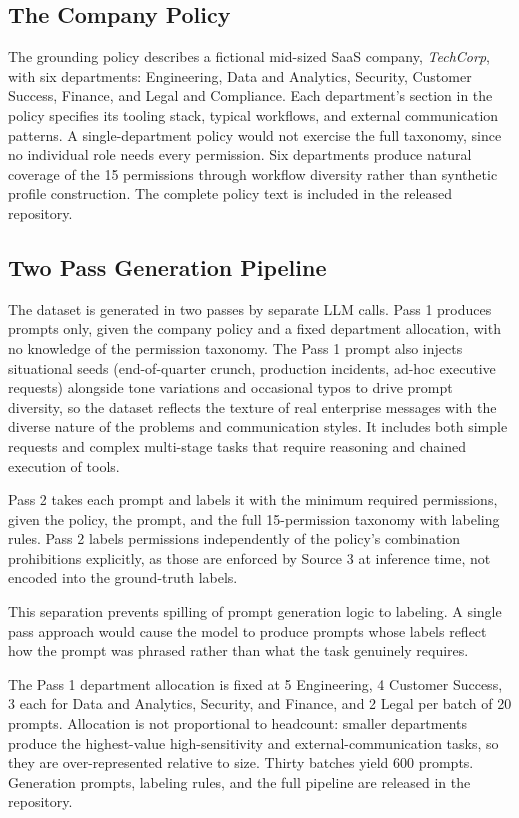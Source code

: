 \documentclass{article}
\theoremstyle{plain}
\theoremstyle{definition}
\theoremstyle{remark}
\begin{document}
\subsection{The Company Policy}
The grounding policy describes a fictional mid-sized SaaS company, 
\emph{TechCorp}, with six departments: Engineering, Data and Analytics, 
Security, Customer Success, Finance, and Legal and Compliance. Each 
department's section in the policy specifies its tooling stack, typical 
workflows, and external communication patterns. A single-department policy would not 
exercise the full taxonomy, since no individual role needs every 
permission. Six departments produce natural coverage of the 15 
permissions through workflow diversity rather than synthetic profile 
construction. The complete policy text is included in the released 
repository.

\subsection{Two Pass Generation Pipeline}
The dataset is generated in two passes by separate LLM calls. Pass 1 
produces prompts only, given the company policy and a fixed department 
allocation, with no knowledge of the permission taxonomy. The Pass 1 
prompt also injects situational seeds (end-of-quarter crunch, production 
incidents, ad-hoc executive requests) alongside tone variations and 
occasional typos to drive prompt diversity, so the dataset reflects the 
texture of real enterprise messages with the diverse nature of the problems and 
communication styles. It includes both simple requests and complex 
multi-stage tasks that require reasoning and chained execution of tools.

Pass 2 takes each prompt and labels it with the minimum required 
permissions, given the policy, the prompt, and the full 15-permission 
taxonomy with labeling rules. Pass 2 labels permissions independently 
of the policy's combination prohibitions explicitly, as those are 
enforced by Source 3 at inference time, not encoded into the 
ground-truth labels.

This separation prevents spilling of prompt generation 
logic to labeling. A single pass approach would cause the model to 
produce prompts whose labels reflect how the prompt was phrased rather 
than what the task genuinely requires.

The Pass 1 department allocation is fixed at 5 Engineering, 4 Customer 
Success, 3 each for Data and Analytics, Security, and Finance, and 2 
Legal per batch of 20 prompts. Allocation is not proportional to 
headcount: smaller departments produce the highest-value high-sensitivity 
and external-communication tasks, so they are over-represented relative 
to size. Thirty batches yield 600 prompts. Generation prompts, labeling 
rules, and the full pipeline are released in the repository.
\end{document}
